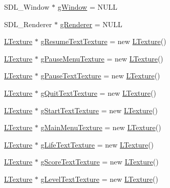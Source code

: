 \begin{DoxyCompactItemize}
\item 
S\+D\+L\+\_\+\+Window $\ast$ \mbox{\hyperlink{class_display_system_ac7946f5ea76f707abd90aaa39f89e83e}{g\+Window}} = N\+U\+LL
\item 
S\+D\+L\+\_\+\+Renderer $\ast$ \mbox{\hyperlink{class_display_system_a711ba89ba3f0430ecb71374ca9835fbf}{g\+Renderer}} = N\+U\+LL
\item 
\mbox{\hyperlink{class_l_texture}{L\+Texture}} $\ast$ \mbox{\hyperlink{class_display_system_ab377658d1ba5a53998157bfbce99f2db}{g\+Resume\+Text\+Texture}} = new \mbox{\hyperlink{class_l_texture}{L\+Texture}}()
\item 
\mbox{\hyperlink{class_l_texture}{L\+Texture}} $\ast$ \mbox{\hyperlink{class_display_system_a2639f05fd2857e3e4106f1a94d6da56d}{g\+Pause\+Menu\+Texture}} = new \mbox{\hyperlink{class_l_texture}{L\+Texture}}()
\item 
\mbox{\hyperlink{class_l_texture}{L\+Texture}} $\ast$ \mbox{\hyperlink{class_display_system_a221a9f0d8f8cb341ba692b17f2bd32d4}{g\+Pause\+Text\+Texture}} = new \mbox{\hyperlink{class_l_texture}{L\+Texture}}()
\item 
\mbox{\hyperlink{class_l_texture}{L\+Texture}} $\ast$ \mbox{\hyperlink{class_display_system_abe61958d1b9aa953d31c3c3142822cdd}{g\+Quit\+Text\+Texture}} = new \mbox{\hyperlink{class_l_texture}{L\+Texture}}()
\item 
\mbox{\hyperlink{class_l_texture}{L\+Texture}} $\ast$ \mbox{\hyperlink{class_display_system_a49892f8737024e23f5787dd308bc69a4}{g\+Start\+Text\+Texture}} = new \mbox{\hyperlink{class_l_texture}{L\+Texture}}()
\item 
\mbox{\hyperlink{class_l_texture}{L\+Texture}} $\ast$ \mbox{\hyperlink{class_display_system_a4dcee3ea0ae2c8d65e07f00c5b061915}{g\+Main\+Menu\+Texture}} = new \mbox{\hyperlink{class_l_texture}{L\+Texture}}()
\item 
\mbox{\hyperlink{class_l_texture}{L\+Texture}} $\ast$ \mbox{\hyperlink{class_display_system_ac7d7bbb9cb0efd8948ec18979ad98c1d}{g\+Life\+Text\+Texture}} = new \mbox{\hyperlink{class_l_texture}{L\+Texture}}()
\item 
\mbox{\hyperlink{class_l_texture}{L\+Texture}} $\ast$ \mbox{\hyperlink{class_display_system_a485da768565e77dc0d9ecc297e475045}{g\+Score\+Text\+Texture}} = new \mbox{\hyperlink{class_l_texture}{L\+Texture}}()
\item 
\mbox{\hyperlink{class_l_texture}{L\+Texture}} $\ast$ \mbox{\hyperlink{class_display_system_a152a811724e56b7d81caad735801697e}{g\+Level\+Text\+Texture}} = new \mbox{\hyperlink{class_l_texture}{L\+Texture}}()

\end{DoxyCompactItemize}

